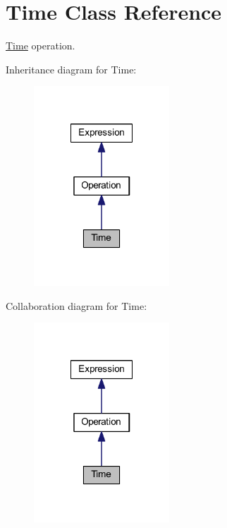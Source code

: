 \hypertarget{class_time}{\section{Time Class Reference}
\label{class_time}
}


\hyperlink{class_time}{Time} operation.  




Inheritance diagram for Time\-:\nopagebreak
\begin{figure}[H]
\begin{center}
\leavevmode
\includegraphics[width=144pt]{class_time__inherit__graph}
\end{center}
\end{figure}


Collaboration diagram for Time\-:\nopagebreak
\begin{figure}[H]
\begin{center}
\leavevmode
\includegraphics[width=144pt]{class_time__coll__graph}
\end{center}
\end{figure}
